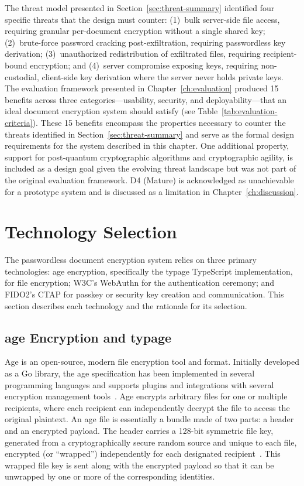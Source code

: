The threat model presented in Section~\ref{sec:threat-summary} identified four specific threats that the design must counter: (1)~bulk server-side file access, requiring granular per-document encryption without a single shared key; (2)~brute-force password cracking post-exfiltration, requiring passwordless key derivation; (3)~unauthorized redistribution of exfiltrated files, requiring recipient-bound encryption; and (4)~server compromise exposing keys, requiring non-custodial, client-side key derivation where the server never holds private keys. The evaluation framework presented in Chapter~\ref{ch:evaluation} produced 15 benefits across three categories---usability, security, and deployability---that an ideal document encryption system should satisfy (see Table~\ref{tab:evaluation-criteria}). These 15 benefits encompass the properties necessary to counter the threats identified in Section~\ref{sec:threat-summary} and serve as the formal design requirements for the system described in this chapter. One additional property, support for post-quantum cryptographic algorithms and cryptographic agility, is included as a design goal given the evolving threat landscape but was not part of the original evaluation framework. D4 (Mature) is acknowledged as unachievable for a prototype system and is discussed as a limitation in Chapter~\ref{ch:discussion}.

\section{Technology Selection}
\label{sec:tech-selection}

The passwordless document encryption system relies on three primary technologies: age encryption, specifically the typage TypeScript implementation, for file encryption; W3C's WebAuthn for the authentication ceremony; and FIDO2's CTAP for passkey or security key creation and communication. This section describes each technology and the rationale for its selection.

\subsection{age Encryption and typage}
\label{sec:age-typage}

Age is an open-source, modern file encryption tool and format. Initially developed as a Go library, the age specification has been implemented in several programming languages and supports plugins and integrations with several encryption management tools~\cite{age_repo}. Age encrypts arbitrary files for one or multiple recipients, where each recipient can independently decrypt the file to access the original plaintext. An age file is essentially a bundle made of two parts: a header and an encrypted payload. The header carries a 128-bit symmetric file key, generated from a cryptographically secure random source and unique to each file, encrypted (or ``wrapped'') independently for each designated recipient~\cite{stauble_age_thesis}. This wrapped file key is sent along with the encrypted payload so that it can be unwrapped by one or more of the corresponding identities.

